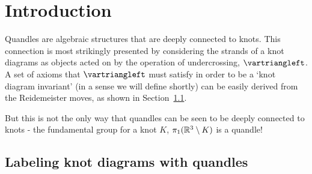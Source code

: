 \documentclass[paper.tex]{subfiles}
\begin{document}
\section{Introduction}
\label{sec:intro}

Quandles are algebraic structures that are deeply connected to knots. This connection is most strikingly presented by considering the strands of a knot diagrams as objects acted on by the operation of
undercrossing, $\uc$. A set of axioms that $\uc$ must satisfy in order to be a `knot diagram invariant' (in a sense we will define shortly) can be easily derived from the Reidemeister moves, as shown in
Section~\ref{sec:quandle_coloring}.

But this is not the only way that quandles can be seen to be deeply connected to knots - the fundamental group for a knot $K$, $\pi_1(\mathbb{R}^3 \setminus K)$ is a quandle!


\subsection{Labeling knot diagrams with quandles}
\label{sec:quandle_coloring}
\end{document}
